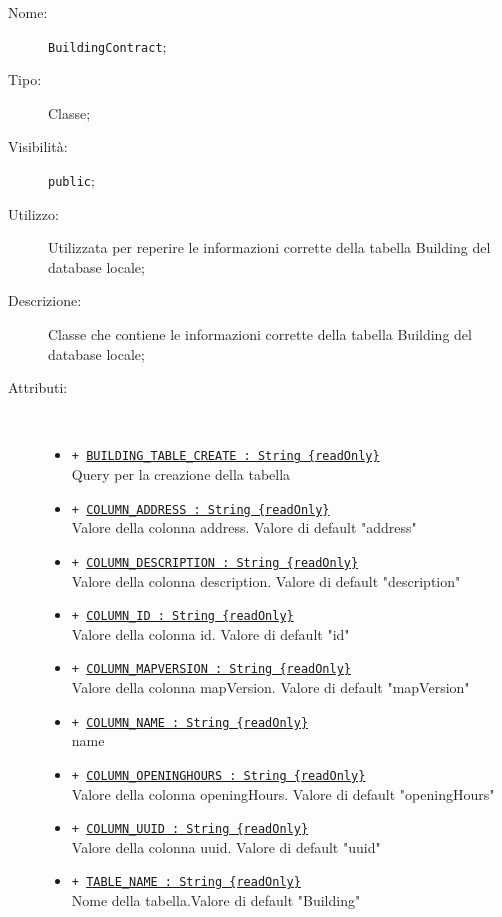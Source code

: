 \documentclass[../DefinizioneDiProdotto.tex]{subfiles}
\begin{document}
    \begin{description}
\item[Nome:] \texttt{BuildingContract};
\item[Tipo:] Classe;
\item[Visibilità:] \texttt{public};
\item[Utilizzo:] Utilizzata per reperire le informazioni corrette della tabella Building del database locale;
\item[Descrizione:] Classe che contiene le informazioni corrette della tabella Building del database locale;
\item[Attributi:] \
\begin{itemize}
\item \texttt{+ \underline{BUILDING\_TABLE\_CREATE : String \{readOnly\}}}\\
Query per la creazione della tabella

\item \texttt{+ \underline{COLUMN\_ADDRESS : String \{readOnly\}}}\\
Valore della colonna address. Valore di default "address"

\item \texttt{+ \underline{COLUMN\_DESCRIPTION : String \{readOnly\}}}\\
Valore della colonna description. Valore di default "description"

\item \texttt{+ \underline{COLUMN\_ID : String \{readOnly\}}}\\
Valore della colonna id. Valore di default "id"

\item \texttt{+ \underline{COLUMN\_MAPVERSION : String \{readOnly\}}}\\
Valore della colonna mapVersion. Valore di default "mapVersion"

\item \texttt{+ \underline{COLUMN\_NAME : String \{readOnly\}}}\\
name

\item \texttt{+ \underline{COLUMN\_OPENINGHOURS : String \{readOnly\}}}\\
Valore della colonna openingHours. Valore di default "openingHours"

\item \texttt{+ \underline{COLUMN\_UUID : String \{readOnly\}}}\\
Valore della colonna uuid. Valore di default "uuid"

\item \texttt{+ \underline{TABLE\_NAME : String \{readOnly\}}}\\
Nome della tabella.Valore di default "Building"

\end{itemize}
\end{description}
\end{document}
